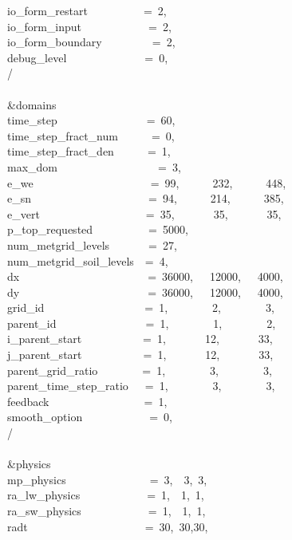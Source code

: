 io\_form\_restart~~~~~~~~~~=~2,\\
io\_form\_input~~~~~~~~~~~~=~2,\\
io\_form\_boundary~~~~~~~~~=~2,\\
debug\_level~~~~~~~~~~~~~~=~0,\\
/\\
\\
\&domains~~~~~~~~~~~~~~~~~\\
time\_step~~~~~~~~~~~~~~~~=~60,\\
time\_step\_fract\_num~~~~~~=~0,\\
time\_step\_fract\_den~~~~~~=~1,\\
max\_dom~~~~~~~~~~~~~~~~~~=~3,\\
e\_we~~~~~~~~~~~~~~~~~~~~~=~99,~~~~~~232,~~~~~~448,\\
e\_sn~~~~~~~~~~~~~~~~~~~~~=~94,~~~~~~214,~~~~~~385,\\
e\_vert~~~~~~~~~~~~~~~~~~~=~35,~~~~~~~35,~~~~~~~35,\\
p\_top\_requested~~~~~~~~~~=~5000,\\
num\_metgrid\_levels~~~~~~~=~27,\\
num\_metgrid\_soil\_levels~~=~4,\\
dx~~~~~~~~~~~~~~~~~~~~~~~=~36000,~~~12000,~~~4000,\\
dy~~~~~~~~~~~~~~~~~~~~~~~=~36000,~~~12000,~~~4000,\\
grid\_id~~~~~~~~~~~~~~~~~~=~1,~~~~~~~~2,~~~~~~~~3,\\
parent\_id~~~~~~~~~~~~~~~~=~1,~~~~~~~~1,~~~~~~~~2,\\
i\_parent\_start~~~~~~~~~~~=~1,~~~~~~~12,~~~~~~~33,\\
j\_parent\_start~~~~~~~~~~~=~1,~~~~~~~12,~~~~~~~33,\\
parent\_grid\_ratio~~~~~~~~=~1,~~~~~~~~3,~~~~~~~~3,\\
parent\_time\_step\_ratio~~~=~1,~~~~~~~~3,~~~~~~~~3,\\
feedback~~~~~~~~~~~~~~~~~=~1,\\
smooth\_option~~~~~~~~~~~~=~0,\\
/\\
\\
\&physics~~~~~~~~~~~~~~~~~\\
mp\_physics~~~~~~~~~~~~~~~=~3,~~3,~3,~\\
ra\_lw\_physics~~~~~~~~~~~~=~1,~~1,~1,~\\
ra\_sw\_physics~~~~~~~~~~~~=~1,~~1,~1,~\\
radt~~~~~~~~~~~~~~~~~~~~~=~30,~30,30,\\
